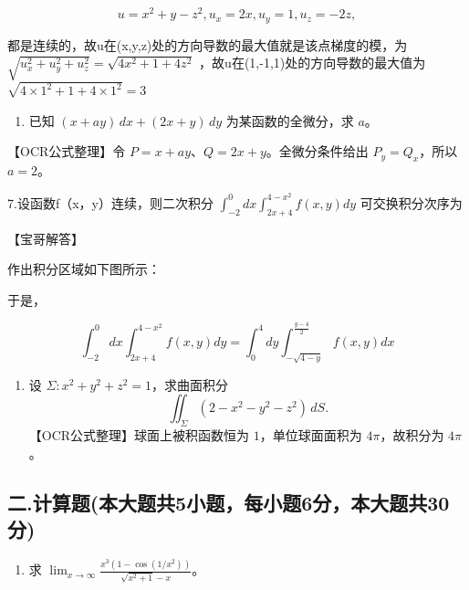 \documentclass[11pt,fontset=fandol]{ctexart}
\providecommand{\tightlist}{\setlength{\itemsep}{0pt}\setlength{\parskip}{0pt}}
\begin{document}
\[
u = x ^ { 2 } + y - z ^ { 2 } , u _ { x } = 2 x , u _ { y } = 1 , u _ { z } = - 2 z ,
\]

都是连续的，故u在(x,y,z)处的方向导数的最大值就是该点梯度的模，为\(\sqrt { u _ { x } ^ { 2 } + u _ { y } ^ { 2 } + u _ { z } ^ { 2 } } = \sqrt { 4 x ^ { 2 } + 1 + 4 z ^ { 2 } }\)
，故u在(1,-1,1)处的方向导数的最大值为\(\sqrt { 4 \times 1 ^ { 2 } + 1 + 4 \times 1 ^ { 2 } } = 3\)

\begin{enumerate}
\def\labelenumi{\arabic{enumi}.}
\setcounter{enumi}{5}
\tightlist
\item
  已知 \((x+ay)\,dx+(2x+y)\,dy\) 为某函数的全微分，求 \(a\)。
\end{enumerate}

【OCR公式整理】令 \(P=x+ay\)、\(Q=2x+y\)。全微分条件给出
\(P_y=Q_x\)，所以 \(a=2\)。

7.设函数f（x，y）连续，则二次积分
\(\int _ { - 2 } ^ { 0 } d x \int _ { 2 x + 4 } ^ { 4 - x ^ { 2 } } f ( x , y ) d y\)
可交换积分次序为

【宝哥解答】

作出积分区域如下图所示：

于是，

\[
\int _ { - 2 } ^ { 0 } d x \int _ { 2 x + 4 } ^ { 4 - x ^ { 2 } } f ( x , y ) d y = \int _ { 0 } ^ { 4 } d y \int _ { - \sqrt { 4 - y } } ^ { \frac { y - 4 } { 2 } } f ( x , y ) d x
\]

\begin{enumerate}
\def\labelenumi{\arabic{enumi}.}
\setcounter{enumi}{7}
\tightlist
\item
  设 \(\Sigma:x^2+y^2+z^2=1\)，求曲面积分 \[
  \iint_\Sigma(2-x^2-y^2-z^2)\,dS.
  \] 【OCR公式整理】球面上被积函数恒为 \(1\)，单位球面面积为
  \(4\pi\)，故积分为 \(4\pi\)。
\end{enumerate}

\subsection{二.计算题(本大题共5小题，每小题6分，本大题共30分)}\label{ux4e8c.ux8ba1ux7b97ux9898ux672cux5927ux9898ux51715ux5c0fux9898ux6bcfux5c0fux98986ux5206ux672cux5927ux9898ux517130ux5206}

\begin{enumerate}
\def\labelenumi{\arabic{enumi}.}
\tightlist
\item
  求
  \(\displaystyle\lim_{x\to\infty}\frac{x^3(1-\cos(1/x^2))}{\sqrt{x^2+1}-x}\)。
\end{enumerate}
\end{document}

